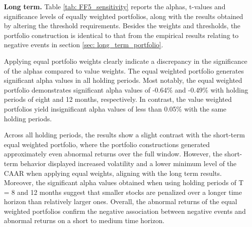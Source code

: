 \textbf{Long term.} Table \ref{tab: FF5_sensitivity} reports the alphas, t-values and significance levels of equally weighted portfolios, along with the results obtained by altering the threshold requirements. Besides the weights and thresholds, the portfolio construction is identical to that from the empirical results relating to negative events in section \ref{sec: long_term_portfolio}.   

Applying equal portfolio weights clearly indicate a discrepancy in the significance of the alphas compared to value weights. The equal weighted portfolio generates significant alpha values in all holding periods. Most notably, the equal weighted portfolio demonstrates significant alpha values of -0.64\% and -0.49\% with holding periods of eight and 12 months, respectively. In contrast, the value weighted portfolios yield insignificant alpha values of less than 0.05\% with the same holding periods. 

Across all holding periods, the results show a slight contrast with the short-term equal weighted portfolio, where the portfolio constructions generated approximately even abnormal returns over the full window. However, the short-term behavior displayed increased volatility and a lower minimum level of the CAAR when applying equal weights, aligning with the long term results. 
Moreover, the significant alpha values obtained when using holding periods of T = 8 and 12 months suggest that smaller stocks are penalized over a longer time horizon than relatively larger ones. 
Overall, the abnormal returns of the equal weighted portfolios confirm the negative association between negative events and abnormal returns on a short to medium time horizon. 

